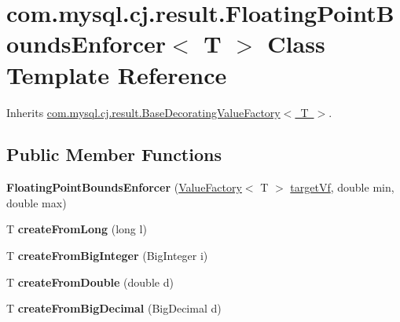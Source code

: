 \hypertarget{classcom_1_1mysql_1_1cj_1_1result_1_1_floating_point_bounds_enforcer}{}\section{com.\+mysql.\+cj.\+result.\+Floating\+Point\+Bounds\+Enforcer$<$ T $>$ Class Template Reference}
\label{classcom_1_1mysql_1_1cj_1_1result_1_1_floating_point_bounds_enforcer}


Inherits \mbox{\hyperlink{classcom_1_1mysql_1_1cj_1_1result_1_1_base_decorating_value_factory}{com.\+mysql.\+cj.\+result.\+Base\+Decorating\+Value\+Factory$<$ T $>$}}.

\subsection*{Public Member Functions}
\begin{DoxyCompactItemize}
\item 
\mbox{\label{classcom_1_1mysql_1_1cj_1_1result_1_1_floating_point_bounds_enforcer_aa07bf70a9f2746c04c7d5707d57361e3}} 
{\bfseries Floating\+Point\+Bounds\+Enforcer} (\mbox{\hyperlink{interfacecom_1_1mysql_1_1cj_1_1result_1_1_value_factory}{Value\+Factory}}$<$ T $>$ \mbox{\hyperlink{classcom_1_1mysql_1_1cj_1_1result_1_1_base_decorating_value_factory_a64c2c62bd9906ec3af7fc62e58bf34b3}{target\+Vf}}, double min, double max)
\item 
\mbox{\label{classcom_1_1mysql_1_1cj_1_1result_1_1_floating_point_bounds_enforcer_adafc614949f2e805f53f8d2c2a84923d}} 
T {\bfseries create\+From\+Long} (long l)
\item 
\mbox{\label{classcom_1_1mysql_1_1cj_1_1result_1_1_floating_point_bounds_enforcer_aea2e56ea65f09ae4ec20978ffc6747d6}} 
T {\bfseries create\+From\+Big\+Integer} (Big\+Integer i)
\item 
\mbox{\label{classcom_1_1mysql_1_1cj_1_1result_1_1_floating_point_bounds_enforcer_a23903d828983506aad93a481709e51df}} 
T {\bfseries create\+From\+Double} (double d)
\item 
\mbox{\label{classcom_1_1mysql_1_1cj_1_1result_1_1_floating_point_bounds_enforcer_aece1717acbf4cd73dbdb8b80d80dd3f5}} 
T {\bfseries create\+From\+Big\+Decimal} (Big\+Decimal d)
\end{DoxyCompactItemize}
